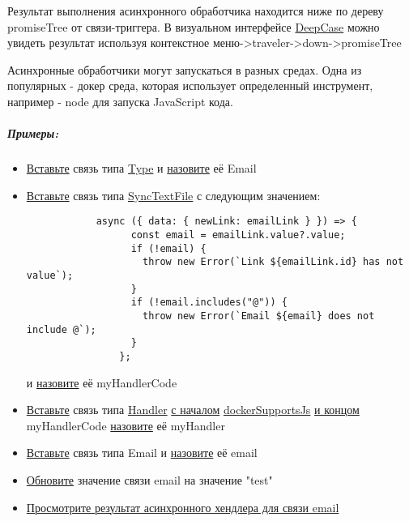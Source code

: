 \documentclass{article}
\begin{document}
\hypertarget{Handlers.Async.HowToGetResult}{}Результат выполнения асинхронного
обработчика находится ниже по дереву
promiseTree от связи-триггера. В визуальном интерфейсе
\hyperlink{DeepCase.Description}{DeepCase} можно увидеть
результат используя контекстное меню->traveler->down->promiseTree

Асинхронные обработчики могут запускаться в разных средах. Одна из популярных -
докер среда, которая использует определенный инструмент, например - node для
запуска JavaScript кода.
\subparagraph{Примеры:}
\begin{itemize}
      \item \hyperlink{DeepCase.InsertLink.Description}{Вставьте} связь типа
            \hyperlink{Core.Type.Description}{Type} и
            \hyperlink{FAQ.HowToSetName}{назовите} её Email
      \item \hyperlink{DeepCase.InsertLink.Description}{Вставьте} связь типа
            \hyperlink{Core.SyncTextFile.Description}{SyncTextFile} с следующим
            значением:
            \begin{lstlisting}
            async ({ data: { newLink: emailLink } }) => {
                  const email = emailLink.value?.value;
                  if (!email) {
                    throw new Error(`Link ${emailLink.id} has not value`);
                  }
                  if (!email.includes("@")) {
                    throw new Error(`Email ${email} does not include @`);
                  }
                };
            \end{lstlisting}
            и \hyperlink{FAQ.HowToSetName}{назовите} её myHandlerCode
      \item \hyperlink{DeepCase.InsertLink.Description}{Вставьте} связь типа
            \hyperlink{Core.Handler.Description}{Handler}
            \hyperlink{FAQ.HowToInsertLinkWithFromAndTo}{с началом}
            \hyperlink{Core.dockerSupportsJs.Description}{dockerSupportsJs}
            \hyperlink{FAQ.HowToInsertLinkWithFromAndTo}{и
                  концом}
            myHandlerCode \hyperlink{FAQ.HowToSetName}{назовите} её myHandler
      \item \hyperlink{DeepCase.InsertLink.Description}{Вставьте} связь типа
            Email и \hyperlink{FAQ.HowToSetName}{назовите} её email
      \item \hyperlink{DeepCase.UpdateLink.Description}{Обновите} значение
            связи email на значение "test"
      \item \hyperlink{Handlers.Async.HowToGetResult}{Просмотрите результат
                  асинхронного хендлера для связи email}

\end{itemize}
\end{document}
